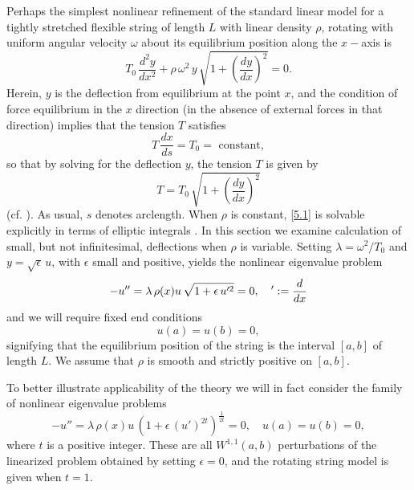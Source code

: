 \documentclass[final]{siamltex}
\numberwithin{equation}{section}
\begin{document}
Perhaps the simplest nonlinear refinement of the standard linear model for a tightly stretched flexible string of length $L$ with linear density $\rho$, rotating with uniform angular velocity $\omega$ about its equilibrium position along the $x-$axis is
\begin{equation} \label{5.1}
T_0 \, \frac{d^2 y}{dx^2} + \rho \, \omega^2 \, y \, \sqrt{1+\left( \frac{dy}{dx}\right)^2}=0.
\end{equation}
Herein, $y$ is the deflection from equilibrium at the point $x$, and the condition of force equilibrium in the $x$ direction (in the absence of external forces in that direction) implies that the tension $T$ satisfies
\[T \, \frac{dx}{ds}= T_0=\text{ constant},\]
so that by solving for the deflection $y$, the tension $T$ is given by
\[T=T_0 \, \sqrt{1+\left( \frac{dy}{dx}\right)^2}\]
(cf. \cite{Hilde}). As usual, $s$ denotes arclength. When $\rho$ is constant, \eqref{5.1} is solvable explicitly in terms of elliptic integrals \cite{Greenhill}. In this section we examine calculation of small, but not infinitesimal, deflections when $\rho$ is variable. Setting $\lambda=\omega^2/T_0$ and $y=\sqrt{\epsilon} \, u$, with $\epsilon$ small and positive, yields the nonlinear eigenvalue problem
\begin{equation}
-u'' = \lambda \, \rho(x) u \, \sqrt{1+ \epsilon \, u'^2}=0, \quad ':=\frac{d}{dx}\notag
\end{equation}
and we will require fixed end conditions
\[u(a)=u(b)=0,\]
signifying that the equilibrium position of the string is the interval $[a,b]$ of length $L$. We assume that $\rho$ is smooth and strictly positive on $[a,b]$.

To better illustrate applicability of the theory we will in fact consider the family of nonlinear eigenvalue problems
\begin{equation} \label{5.2}
-u'' = \lambda \, \rho(x) u \, \left(1+ \epsilon \, \left(u'\right)^{2 t}\right)^{\frac{1}{2t}}=0, \quad
u(a)=u(b)=0,
\end{equation}
where $t$ is a positive integer. These are all $W^{1,1}(a,b)$ perturbations of the linearized problem obtained by setting $\epsilon=0$, and the rotating string model is given when $t=1$.
\end{document}
